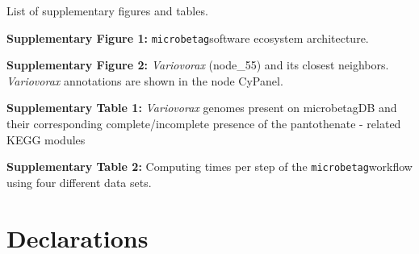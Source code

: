 \documentclass[sn-mathphys,Numbered]{sn-jnl}  %
\theoremstyle{thmstyleone}%
\theoremstyle{thmstyletwo}%
\theoremstyle{thmstylethree}%
\newcommand{\microbetag}{\texttt{microbetag}}
\begin{document}
\backmatter



\label{supplementary-files}
    
    List of supplementary figures and tables.

    \textbf{Supplementary Figure 1:} \microbetag software ecosystem architecture.

    \textbf{Supplementary Figure 2:} \textit{Variovorax} (node\_55) and its closest neighbors. \textit{Variovorax} annotations are shown in the node CyPanel.

    \textbf{Supplementary Table 1:} \textit{Variovorax} genomes present on microbetagDB and their corresponding complete/incomplete presence of the pantothenate - 
    related KEGG modules

    \textbf{Supplementary Table 2:} Computing times per step of the \microbetag workflow using four different data sets. 



\section*{Declarations}
\end{document}
